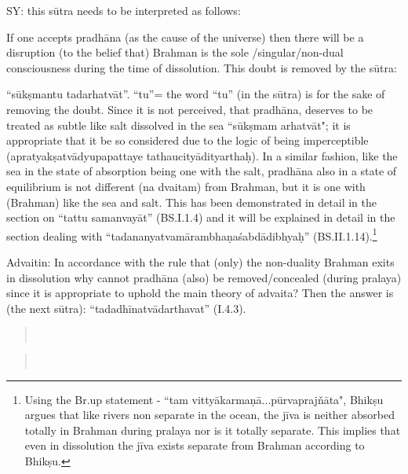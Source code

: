 SY: this sūtra needs to be interpreted as follows:

If one accepts pradhāna (as the cause of the universe) then there will be a disruption (to the belief that) Brahman is the sole /singular/non-dual consciousness during the time of dissolution. This doubt is removed by the sūtra: 

“sūkṣmantu tadarhatvāt”. “tu”= the word “tu” (in the sūtra) is for the sake of removing the doubt. Since it is not perceived, that pradhāna, deserves to be treated as subtle like salt dissolved in the sea ``sūkṣmam arhatvāt"; it is appropriate that it be so considered due to the logic of being imperceptible  (apratyakṣatvādyupapattaye tathaucityādityarthaḥ). In a similar fashion, like the sea in the state of absorption being one with the salt, pradhāna also in a state of equilibrium is not different (na dvaitam) from Brahman, but it is one with (Brahman) like the sea and salt. This has been demonstrated in detail in the section on “tattu samanvayāt” (BS.I.1.4) and it will be explained in detail in the section dealing with “tadananyatvamārambhaṇaśabdādibhyaḥ” (BS.II.1.14).\footnote{Using the Br.up statement - ``tam vittyākarmaṇā...pūrvaprajňāta", Bhikṣu argues that like rivers non separate in the ocean, the jīva is neither absorbed totally in Brahman during pralaya nor is it totally separate. This implies that even in dissolution the jīva exists separate from Brahman according to Bhikṣu.}

Advaitin: In accordance with the rule that (only) the non-duality Brahman exits in dissolution why cannot pradhāna (also) be removed/con\-cealed (during pralaya) since it is appropriate to uphold the main theory of advaita? Then the answer is (the next sūtra): “tadadhīnatvādarthavat” (I.4.3).

\textbf{}


\begin{verse}
\\
\end{verse}


\begin{verse}
\\
\end{verse}

